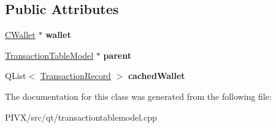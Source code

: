 \subsection*{Public Attributes}
\begin{DoxyCompactItemize}
\item 
\mbox{\label{class_transaction_table_priv_a01cb7d238e5dea44b9f7f1ee75d5849d}} 
\mbox{\hyperlink{class_c_wallet}{C\+Wallet}} $\ast$ {\bfseries wallet}
\item 
\mbox{\label{class_transaction_table_priv_a358d460cf7c3074fba12d03cdc5f638d}} 
\mbox{\hyperlink{class_transaction_table_model}{Transaction\+Table\+Model}} $\ast$ {\bfseries parent}
\item 
\mbox{\label{class_transaction_table_priv_a410380e0d05152cf1d121f0ba0727ea8}} 
Q\+List$<$ \mbox{\hyperlink{class_transaction_record}{Transaction\+Record}} $>$ {\bfseries cached\+Wallet}
\end{DoxyCompactItemize}


The documentation for this class was generated from the following file\+:\begin{DoxyCompactItemize}
\item 
P\+I\+V\+X/src/qt/transactiontablemodel.\+cpp\end{DoxyCompactItemize}

